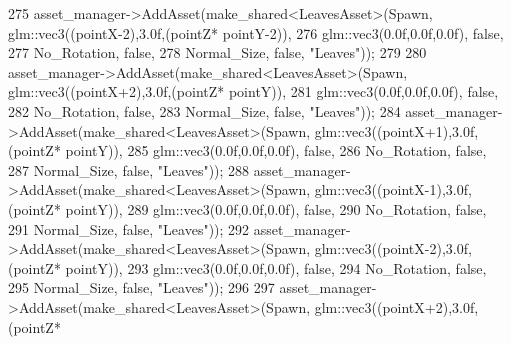 \begin{DoxyCode}
275             asset\_manager->AddAsset(make\_shared<LeavesAsset>(Spawn, glm::vec3((pointX-2),3.0f,(pointZ*
      pointY-2)),
276                                                              glm::vec3(0.0f,0.0f,0.0f), \textcolor{keyword}{false},
277                                                              No\_Rotation, \textcolor{keyword}{false},
278                                                              Normal\_Size, \textcolor{keyword}{false}, \textcolor{stringliteral}{"Leaves"}));
279 
280             asset\_manager->AddAsset(make\_shared<LeavesAsset>(Spawn, glm::vec3((pointX+2),3.0f,(pointZ*
      pointY)),
281                                                              glm::vec3(0.0f,0.0f,0.0f), \textcolor{keyword}{false},
282                                                              No\_Rotation, \textcolor{keyword}{false},
283                                                              Normal\_Size, \textcolor{keyword}{false}, \textcolor{stringliteral}{"Leaves"}));
284             asset\_manager->AddAsset(make\_shared<LeavesAsset>(Spawn, glm::vec3((pointX+1),3.0f,(pointZ*
      pointY)),
285                                                              glm::vec3(0.0f,0.0f,0.0f), \textcolor{keyword}{false},
286                                                              No\_Rotation, \textcolor{keyword}{false},
287                                                              Normal\_Size, \textcolor{keyword}{false}, \textcolor{stringliteral}{"Leaves"}));
288             asset\_manager->AddAsset(make\_shared<LeavesAsset>(Spawn, glm::vec3((pointX-1),3.0f,(pointZ*
      pointY)),
289                                                              glm::vec3(0.0f,0.0f,0.0f), \textcolor{keyword}{false},
290                                                              No\_Rotation, \textcolor{keyword}{false},
291                                                              Normal\_Size, \textcolor{keyword}{false}, \textcolor{stringliteral}{"Leaves"}));
292             asset\_manager->AddAsset(make\_shared<LeavesAsset>(Spawn, glm::vec3((pointX-2),3.0f,(pointZ*
      pointY)),
293                                                              glm::vec3(0.0f,0.0f,0.0f), \textcolor{keyword}{false},
294                                                              No\_Rotation, \textcolor{keyword}{false},
295                                                              Normal\_Size, \textcolor{keyword}{false}, \textcolor{stringliteral}{"Leaves"})); 
296 
297             asset\_manager->AddAsset(make\_shared<LeavesAsset>(Spawn, glm::vec3((pointX+2),3.0f,(pointZ*

\end{DoxyCode}
